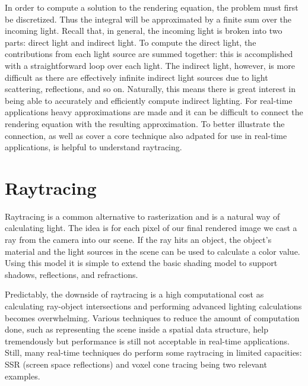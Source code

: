 In order to compute a solution to the rendering equation, the problem must first be discretized. Thus the integral will be approximated by a finite sum over the incoming light. Recall that, in general, the incoming light is broken into two parts: direct light and indirect light. To compute the direct light, the contributions from each light source are summed together: this is accomplished with a straightforward loop over each light. The indirect light, however, is more difficult as there are effectively infinite indirect light sources due to light scattering, reflections, and so on. Naturally, this means there is great interest in being able to accurately and efficiently compute indirect lighting. For real-time applications heavy approximations are made and it can be difficult to connect the rendering equation with the resulting approximation. To better illustrate the connection, as well as cover a core technique also adpated for use in real-time applications, is helpful to understand raytracing.


\section{Raytracing}
Raytracing is a common alternative to rasterization and is a natural way of calculating light. The idea is for each pixel of our final rendered image we cast a ray from the camera into our scene. If the ray hits an object, the object's material and the light sources in the scene can be used to calculate a color value. Using this model it is simple to extend the basic shading model to support shadows, reflections, and refractions.

Predictably, the downside of raytracing is a high computational cost as calculating ray-object intersections and performing advanced lighting calculations becomes overwhelming. Various techniques to reduce the amount of computation done, such as representing the scene inside a spatial data structure, help tremendously but performance is still not acceptable in real-time applications. Still, many real-time techniques do perform some raytracing in limited capacities: SSR (screen space reflections) and voxel cone tracing being two relevant examples.

